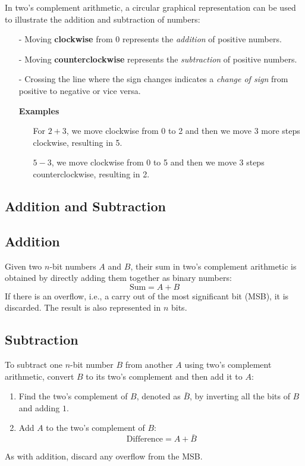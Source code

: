 \documentclass[12pt,openany]{book}
\begin{document}
		In two's complement arithmetic, a circular graphical representation can be used to illustrate the addition and subtraction of numbers:
		\begin{itemize}
			\item[-] Moving \textbf{clockwise} from 0 represents the \textit{addition} of positive numbers.
			\item[-] Moving \textbf{counterclockwise} represents the \textit{subtraction} of positive numbers.
			\item[-] Crossing the line where the sign changes indicates a \textit{change of sign} from positive to negative or vice versa.
			\item[] \textbf{Examples}
			      \begin{itemize}
			      	\item[] For \(2 + 3\), we move clockwise from 0 to 2 and then we move 3 more steps clockwise, resulting in 5.
			      	\item[] \(5 - 3\), we move clockwise from 0 to 5 and then we move 3 steps counterclockwise, resulting in 2.  
			      \end{itemize}
		\end{itemize}
		
		\subsection{Addition and Subtraction}
		\subsection{Addition}
		Given two \(n\)-bit numbers \(A\) and \(B\), their sum in two's complement arithmetic is obtained by directly adding them together as binary numbers:
		\begin{equation}
			\text{Sum} = A + B
		\end{equation}
		If there is an overflow, i.e., a carry out of the most significant bit (MSB), it is discarded. The result is also represented in \(n\) bits.
		
		\subsection{Subtraction}
		To subtract one \(n\)-bit number \(B\) from another \(A\) using two's complement arithmetic, convert \(B\) to its two's complement and then add it to \(A\):
		\begin{enumerate}
			\item Find the two's complement of \(B\), denoted as \(\bar{B}\), by inverting all the bits of \(B\) and adding \(1\).
			\item Add \(A\) to the two's complement of \(B\):
			      \begin{equation}
			      	\text{Difference} = A + \bar{B}
			      \end{equation}
		\end{enumerate}
		As with addition, discard any overflow from the MSB.
		
\end{document}

